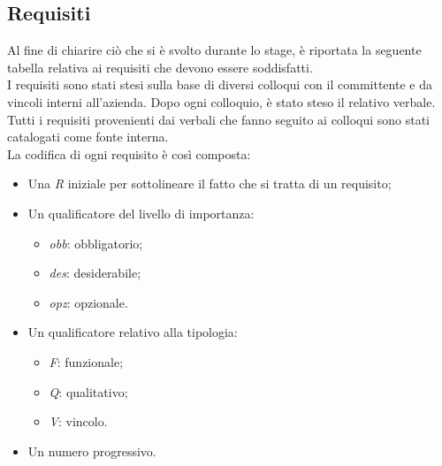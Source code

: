 \subsection{Requisiti}
Al fine di chiarire ciò che si è svolto durante lo stage, è riportata la seguente tabella relativa ai requisiti che devono essere soddisfatti.\\
I requisiti sono stati stesi sulla base di diversi colloqui con il committente e da vincoli interni all'azienda. Dopo ogni  colloquio, è stato steso il relativo verbale.\\ Tutti i requisiti provenienti dai verbali che fanno seguito ai colloqui sono stati catalogati come fonte interna.\\
La codifica di ogni requisito è così composta:
\begin{itemize}
	\item Una \textit{R} iniziale per sottolineare il fatto che si tratta di un requisito;
	\item Un qualificatore del livello di importanza:
	\begin{itemize}
		\item \textit{obb}: obbligatorio;
		\item \textit{des}: desiderabile;
		\item \textit{opz}: opzionale.
	\end{itemize}
	\item Un qualificatore relativo alla tipologia:
	\begin{itemize}
		\item \textit{F}: funzionale;
		\item \textit{Q}: qualitativo;
		\item \textit{V}: vincolo.
	\end{itemize}
	\item Un numero progressivo.
\end{itemize}

